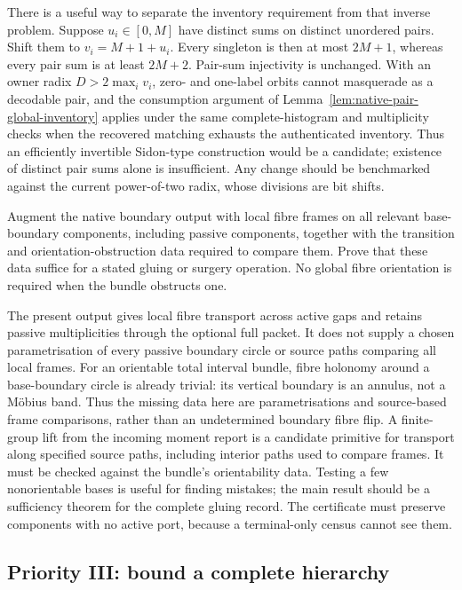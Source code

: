 There is a useful way to separate the inventory requirement from that
inverse problem.  Suppose $u_i\in[0,M]$ have distinct sums on distinct
unordered pairs.  Shift them to $v_i=M+1+u_i$.  Every singleton is then at
most $2M+1$, whereas every pair sum is at least $2M+2$.  Pair-sum
injectivity is unchanged.  With an owner radix $D>2\max_i v_i$, zero-
and one-label orbits cannot masquerade as a decodable pair, and the
consumption argument of Lemma~\ref{lem:native-pair-global-inventory}
applies under the same complete-histogram and multiplicity checks when
the recovered matching exhausts the authenticated inventory.  Thus an
efficiently invertible Sidon-type construction would
be a candidate; existence of distinct pair sums alone is insufficient.
Any change should be benchmarked against the current power-of-two radix,
whose divisions are bit shifts.

\begin{problem}
Augment the native boundary output with local fibre frames on all relevant
base-boundary components, including passive components, together with the
transition and orientation-obstruction data required to compare them.
Prove that these data suffice for a stated gluing or surgery operation.
No global fibre orientation is required when the bundle obstructs one.
\end{problem}

The present output gives local fibre transport across active gaps and
retains passive multiplicities through the optional full packet.  It
does not supply a chosen parametrisation of every passive boundary circle
or source paths comparing all local frames.  For an orientable total
interval bundle, fibre holonomy around a base-boundary circle is already
trivial: its vertical boundary is an annulus, not a M\"obius band.  Thus
the missing data here are parametrisations and source-based frame
comparisons, rather than an undetermined boundary fibre flip.  A
finite-group lift from the incoming moment report is a candidate primitive
for transport along specified source paths, including interior paths used
to compare frames.  It must be checked against the bundle's orientability
data.
Testing a few nonorientable bases is useful for finding mistakes; the
main result should be a sufficiency theorem for the complete gluing
record.  The certificate must preserve components with no active port,
because a terminal-only census cannot see them.

\subsection{Priority III: bound a complete hierarchy}

